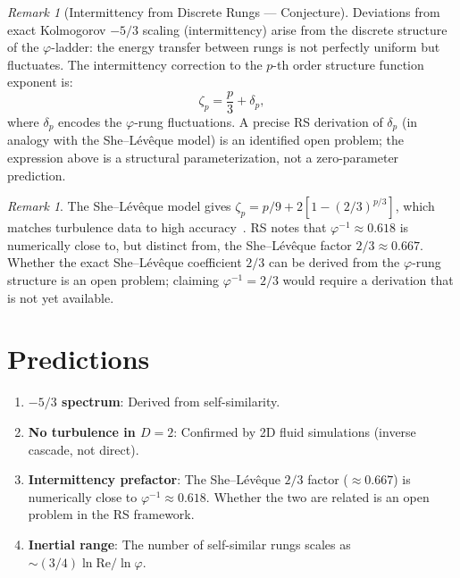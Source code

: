 \documentclass[12pt,a4paper]{article}
\theoremstyle{definition}
\theoremstyle{remark}
\newtheorem{remark}[theorem]{Remark}
\begin{document}
\begin{remark}[Intermittency from Discrete Rungs --- Conjecture]
Deviations from exact Kolmogorov $-5/3$ scaling (intermittency)
arise from the discrete structure of the $\varphi$-ladder: the
energy transfer between rungs is not perfectly uniform but
fluctuates.  The intermittency correction to the $p$-th order
structure function exponent is:
\begin{equation}
  \zeta_p = \frac{p}{3} + \delta_p,
\end{equation}
where $\delta_p$ encodes the $\varphi$-rung fluctuations.  A
precise RS derivation of $\delta_p$ (in analogy with the
She--L\'ev\^eque model) is an identified open problem; the
expression above is a structural parameterization, not a
zero-parameter prediction.
\end{remark}

\begin{remark}
The She--L\'ev\^eque model gives
$\zeta_p = p/9 + 2[1 - (2/3)^{p/3}]$, which matches turbulence
data to high accuracy~\cite{SheLeveque}.  RS notes that
$\varphi^{-1} \approx 0.618$ is numerically close to, but
distinct from, the She--L\'ev\^eque factor $2/3 \approx 0.667$.
Whether the exact She--L\'ev\^eque coefficient $2/3$ can be
derived from the $\varphi$-rung structure is an open problem;
claiming $\varphi^{-1} = 2/3$ would require a derivation that
is not yet available.
\end{remark}

\section{Predictions}
\label{sec:predictions}

\begin{enumerate}
  \item \textbf{$-5/3$ spectrum}: Derived from self-similarity.

  \item \textbf{No turbulence in $D = 2$}: Confirmed by 2D
  fluid simulations (inverse cascade, not direct).

  \item \textbf{Intermittency prefactor}: The She--L\'ev\^eque
  $2/3$ factor ($\approx 0.667$) is numerically close to
  $\varphi^{-1} \approx 0.618$.  Whether the two are related is
  an open problem in the RS framework.

  \item \textbf{Inertial range}: The number of self-similar
  rungs scales as $\sim (3/4)\ln\mathrm{Re}/\ln\varphi$.
\end{enumerate}
\end{document}
